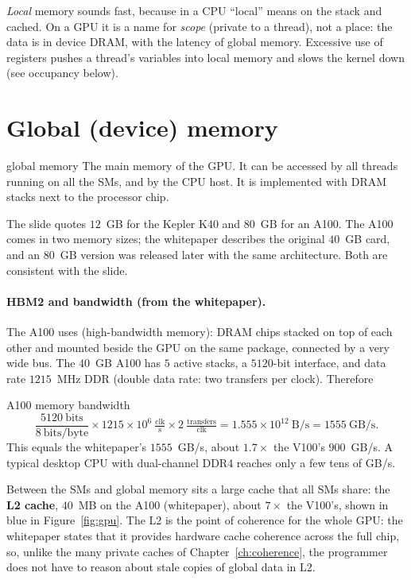 \begin{pitfall}
\emph{Local} memory sounds fast, because in a CPU ``local'' means on the stack and cached. On a GPU it is a name for \emph{scope} (private to a thread),
not a place: the data is in device DRAM, with the latency of global memory. Excessive use of registers pushes a thread's variables into local memory and slows the kernel down (see occupancy below).
\end{pitfall}

\section{Global (device) memory}


\begin{definition}{global memory}
The main memory of the GPU. It can be accessed by all threads running on all the SMs, and by the CPU host. It is implemented with DRAM stacks next to the processor chip.
\end{definition}
The slide quotes $12$~GB for the Kepler K40 and $80$~GB for an A100. The A100 comes in two memory sizes; the whitepaper describes the original $40$~GB card, and an $80$~GB version was
released later with the same architecture. Both are consistent with the slide.

\paragraph{HBM2 and bandwidth (from the whitepaper).}
The A100 uses  (high-bandwidth memory): DRAM chips stacked on top of each other and mounted beside the GPU on the same package, connected by a very wide bus. The $40$~GB A100 has $5$ active stacks, a $5120$-bit interface, and
data rate $1215$~MHz DDR (double data rate: two transfers per clock). Therefore
\begin{workedex}{A100 memory bandwidth}
\[
 \frac{5120\ \text{bits}}{8\ \text{bits/byte}}\times1215\times10^{6}\ \tfrac{\text{clk}}{\text{s}}\times2\ \tfrac{\text{transfers}}{\text{clk}}
 =1.555\times10^{12}\ \text{B/s}=1555\ \text{GB/s}.
\]
This equals the whitepaper's $1555$~GB/s, about $1.7\times$ the V100's $900$~GB/s. A typical desktop CPU with dual-channel DDR4 reaches only a few tens of GB/s.
\end{workedex}

Between the SMs and global memory sits a large cache that all SMs share: the \textbf{L2 cache}, $40$~MB on the A100 (whitepaper), about $7\times$ the V100's, shown in blue in Figure~\ref{fig:gpu}.
The L2 is the point of coherence for the whole GPU: the whitepaper states that it provides hardware cache coherence across the full chip, so, unlike the many private caches of Chapter~\ref{ch:coherence}, the programmer does not have to reason about stale copies of global data in L2.

